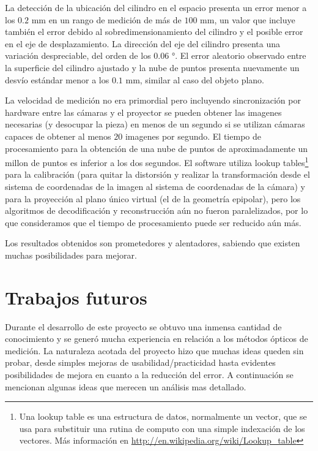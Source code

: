 La detección de la ubicación del cilindro en el espacio presenta un error menor a los $0.2$ mm en un rango de medición de más de $100$ mm, un valor que incluye también el error debido al sobredimensionamiento del cilindro y el posible error en el eje de desplazamiento.
La dirección del eje del cilindro presenta una variación despreciable, del orden de los $0.06$ °. 
El error aleatorio observado entre la superficie del cilindro ajustado y la nube de puntos presenta nuevamente un desvío estándar menor a los $0.1$ mm, similar al caso del objeto plano.

La velocidad de medición no era primordial pero incluyendo sincronización por hardware entre las cámaras y el proyector se pueden obtener las imagenes necesarias (y desocupar la pieza) en menos de un segundo si se utilizan cámaras capaces de obtener al menos $20$ imagenes por segundo. El tiempo de procesamiento para la obtención de una nube de puntos de aproximadamente un millon de puntos es inferior a los dos segundos. El software utiliza lookup tables\footnote{Una lookup table es una estructura de datos, normalmente un vector, que se usa para substituir una rutina de computo con una simple indexación de los vectores. Más información en \url{http://en.wikipedia.org/wiki/Lookup_table}} para la calibración (para quitar la distorsión y realizar la transformación desde el sistema de coordenadas de la imagen al sistema de coordenadas de la cámara) y para la proyección al plano único virtual (el de la geometría epipolar), pero los algoritmos de decodificación y reconstrucción aún no fueron paralelizados, por lo que consideramos que el tiempo de procesamiento puede ser reducido aún más.

Los resultados obtenidos son prometedores y alentadores, sabiendo que existen muchas posibilidades para mejorar.

\section{Trabajos futuros}
Durante el desarrollo de este proyecto se obtuvo una inmensa cantidad de conocimiento y se generó mucha experiencia en relación a los métodos ópticos de medición. La naturaleza acotada del proyecto hizo que muchas ideas queden sin probar, desde simples mejoras de usabilidad/practicidad hasta evidentes posibilidades de mejora en cuanto a la reducción del error. A continuación se mencionan algunas ideas que merecen un análisis mas detallado.

